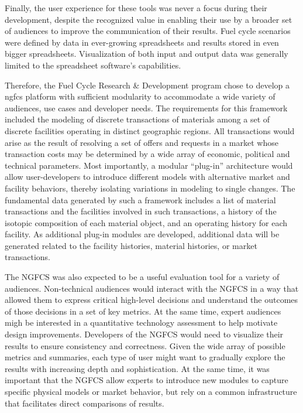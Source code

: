 Finally, the user experience for these tools was never a focus during their
development, despite the recognized value in enabling their use by a broader
set of audiences to improve the communication of their results.  Fuel cycle
scenarios were defined by data in ever-growing spreadsheets and results stored
in even bigger spreadsheets.  Visualization of both input and output data was
generally limited to the spreadsheet software's capabilities.

Therefore, the Fuel Cycle Research \& Development program chose to develop a
\gls{ngfcs} platform with sufficient modularity to accommodate a wide variety
of audiences, use cases and developer needs. The requirements for this
framework included the modeling of discrete transactions of materials among a
set of discrete facilities operating in distinct geographic regions. All
transactions would arise as the result of resolving a set of offers and
requests in a market whose transaction costs may be determined by a wide array
of economic, political and technical parameters. Most importantly, a modular
“plug-in” architecture would allow user-developers to introduce different
models with alternative market and facility behaviors, thereby isolating
variations in modeling to single changes. The fundamental data generated by
such a framework includes a list of material transactions and the facilities
involved in such transactions, a history of the isotopic composition of each
material object, and an operating history for each facility. As additional
plug-in modules are developed, additional data will be generated related to
the facility histories, material histories, or market transactions.

The NGFCS was also expected to be a useful evaluation tool for a variety of
audiences.  Non-technical audiences would interact with the NGFCS in a way
that allowed them to express critical high-level decisions and understand the
outcomes of those decisions in a set of key metrics. At the same time, expert
audiences migh be interested in a quantitative technology assessment to help
motivate design improvements. Developers of the NGFCS would need to visualize
their results to ensure consistency and correctness. Given the wide array of
possible metrics and summaries, each type of user might want to gradually
explore the results with increasing depth and sophistication. At the same
time, it was important that the NGFCS allow experts to introduce new modules
to capture specific physical models or market behavior, but rely on a common
infrastructure that facilitates direct comparisons of results.

